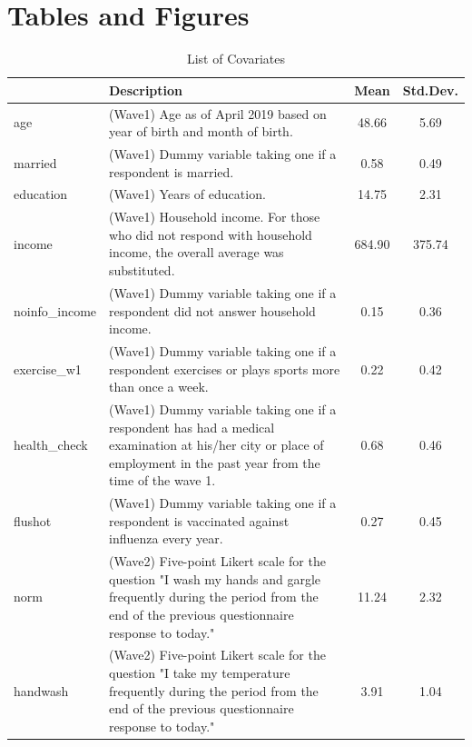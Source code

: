 \documentclass[
]{article}
\begin{document}
\clearpage

\hypertarget{appendix-appendix}{%
\appendix}


\hypertarget{tables-and-figures}{%
\section{Tables and Figures}\label{tables-and-figures}}

\begin{table}[!h]

\caption{\label{tab:covariate-list}List of Covariates}
\centering
\fontsize{9}{11}\selectfont
\begin{tabular}[t]{l>{\raggedright\arraybackslash}p{30em}cc}
\toprule
  & Description & Mean & Std.Dev.\\
\midrule
age & (Wave1) Age as of April 2019 based on year of birth and month of birth. & \num{48.66} & \num{5.69}\\
married & (Wave1) Dummy variable taking one if a respondent is married. & \num{0.58} & \num{0.49}\\
education & (Wave1) Years of education. & \num{14.75} & \num{2.31}\\
income & (Wave1) Household income. For those who did not respond with household income, the overall average was substituted. & \num{684.90} & \num{375.74}\\
noinfo\_income & (Wave1) Dummy variable taking one if a respondent did not answer household income. & \num{0.15} & \num{0.36}\\
exercise\_w1 & (Wave1) Dummy variable taking one if a respondent exercises or plays sports more than once a week. & \num{0.22} & \num{0.42}\\
health\_check & (Wave1) Dummy variable taking one if a respondent has had a medical examination at his/her city or place of employment in the past year from the time of the wave 1. & \num{0.68} & \num{0.46}\\
flushot & (Wave1) Dummy variable taking one if a respondent is vaccinated against influenza every year. & \num{0.27} & \num{0.45}\\
norm & (Wave2) Five-point Likert scale for the question "I wash my hands and gargle frequently during the period from the end of the previous questionnaire response to today." & \num{11.24} & \num{2.32}\\
handwash & (Wave2) Five-point Likert scale for the question "I take my temperature frequently during the period from the end of the previous questionnaire response to today." & \num{3.91} & \num{1.04}\\

\end{tabular}
\end{table}
\end{document}
